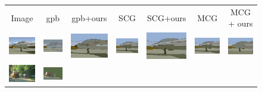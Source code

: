 \begin{figure}[tb]
\begin{center}
\begin{tabular}{ c  c  c  c  c  c  c }
Image & gpb & gpb+ours & SCG & SCG+ours & MCG & MCG + ours \\
\includegraphics[width=2cm]{fig/visual_result/visual_result_1_1.png}
&\includegraphics[width=2cm]{fig/visual_result/visual_result_1_2.png}
&\includegraphics[width=2cm]{fig/visual_result/visual_result_1_3.png}
&\includegraphics[width=2cm]{fig/visual_result/visual_result_1_4.png}
&\includegraphics[width=2cm]{fig/visual_result/visual_result_1_5.png}
&\includegraphics[width=2cm]{fig/visual_result/visual_result_1_6.png}
&\includegraphics[width=2cm]{fig/visual_result/visual_result_1_7.png}
\\
\includegraphics[width=2cm]{fig/visual_result/visual_result_2_1.png}
&\includegraphics[width=2cm]{fig/visual_result/visual_result_2_2.png}

\end{tabular}
\end{center}
\end{figure}
